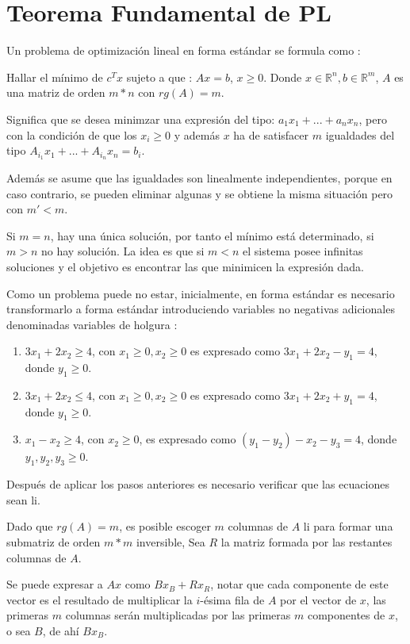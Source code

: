 \documentclass[14pt]{extarticle}
\begin{document}
\section{Teorema Fundamental de PL}

Un problema de optimización lineal en forma estándar se formula como :

Hallar el mínimo de $c^T x$ sujeto a que : $Ax = b$, $x \geq 0$. Donde $x \in \mathbb{R}^n, b \in \mathbb{R}^m$, $A$ es una matriz de orden $m * n$ con $rg(A) = m$. 

Significa que se desea minimzar una expresión del tipo: $a_1 x_1 + ... + a_n x_n$, pero con la condición de que los $x_i \geq 0$ y además $x$ ha de satisfacer $m$ igualdades del tipo $A_{i_1} x_1 + ... + A_{i_n} x_n = b_i$.

Además se asume que las igualdades son linealmente independientes, porque en caso contrario, se pueden eliminar algunas y se obtiene la misma situación pero con $m' < m$.

Si $m = n$, hay una única solución, por tanto el mínimo está determinado, si $m > n$ no hay solución. La idea es que si $m < n$ el sistema posee infinitas soluciones y el objetivo es encontrar las que minimicen la expresión dada.

Como un problema puede no estar, inicialmente, en forma estándar es necesario transformarlo a forma estándar introduciendo variables no negativas adicionales denominadas variables de holgura :

\begin{enumerate}
	\item $3x_1 + 2x_2 \geq 4$, con $x_1 \geq 0, x_2 \geq 0$ es expresado como $3x_1 + 2x_2 - y_1 = 4$, donde $y_1 \geq 0$.
	\item $3x_1 + 2x_2 \leq 4$, con $x_1 \geq 0, x_2 \geq 0$ es expresado como $3x_1 + 2x_2 + y_1 = 4$, donde $y_1 \geq 0$.
	\item $x_1 - x_2 \geq 4$, con $x_2 \geq 0$, es expresado como $(y_1 - y_2) - x_2 - y_3 = 4$, donde $y_1, y_2, y_3 \geq 0$.
\end{enumerate}

Después de aplicar los pasos anteriores es necesario verificar que las ecuaciones sean li.

Dado que $rg(A) = m$, es posible escoger $m$ columnas de $A$ li para formar una submatriz de orden $m * m$ inversible, Sea $R$ la matriz formada por las restantes columnas de $A$.

Se puede expresar a $Ax$ como $Bx_B + Rx_R$, notar que cada componente de este vector es el resultado de multiplicar la $i$-ésima fila de $A$ por el vector de $x$, las primeras $m$ columnas serán multiplicadas por las primeras $m$ componentes de $x$, o sea $B$, de ahí $Bx_B$.
\end{document}
